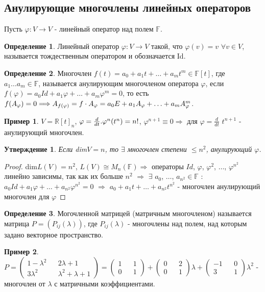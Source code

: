 \documentclass[a4paper, 12pt]{article}
\newcommand{\R}{\mathbb R}
\newcommand{\F}{\mathbb F}
\renewcommand{\phi}{\varphi}
\theoremstyle{definition}
\newtheorem*{definition}{Определение}
\newtheorem*{example1}{Пример}
\theoremstyle{plain}
\newtheorem*{subtheorem}{Утверждение}
\theoremstyle{remark}
\begin{document}
  \subsection{Анулирующие многочлены линейных операторов}
  Пусть $\phi: V\to V$ - линейный оператор над полем $\F$. \\
  \begin{definition}
    Линейный оператор $\phi: V\to V$ такой, что $\phi(v) = v$ $\forall v\in V$, называется тождественным оператором и обозначается Id.
  \end{definition}
  \begin{definition}
    Многочлен $f(t) = a_0+a_1t+\ldots+a_mt^m\in\F[t]$, где $a_1\ldots a_m\in\F$, называется анулирующим многочленом оператора $\phi$, если $f(\phi) = a_0Id+a_1\phi+\ldots+a_m\phi^m = 0$, то есть $f(A_{\phi}) = 0 \\
    \Longrightarrow A_{f(\phi)} = f\cdot A_{\phi} = a_0E+a_1A_{\phi}+\ldots+a_mA_{\phi}^m$.
  \end{definition}
  \begin{example1}
    $V = \R[t]_n$, $\phi = \frac{d}{dt}. \\
    \phi^n(t^n) = n!$, $\phi^{n+1}\equiv0 \Longrightarrow$ для $\phi = \frac{d}{dt}$ $t^{n+1}$ - анулирующий многочлен.
  \end{example1}
  \begin{subtheorem}
    Если dim$V = n$, то $\exists$ многочлен степени $\leq n^2$, анулирующий $\phi$. 
  \end{subtheorem}
  \begin{proof}
    dim$L(V) = n^2$, $L(V) \cong M_n(\F) \Longrightarrow$ операторы $Id$, $\phi$, $\phi^2$, $\ldots$, $\phi^{n^2}$ линейно зависимы, так как их больше $n^2$ $\Longrightarrow$ $\exists$ $a_0$, $\ldots$, $a_{n^2} \in \F$ : $a_0Id+a_1\phi+\ldots+a_{n^2}\phi^{n^2} = 0$ $\Longrightarrow$ $a_0+a_1t+\ldots+a_{n^2}t^{n^2}$ - многочлен анулирующий многочлен для $\phi$
  \end{proof}
  \begin{definition}
    Могочленной матрицей (матричным многочленом) называется матрица $P = (P_{ij}(\lambda))$, где $P_{ij}(\lambda)$ - многочлены над полем, над которым задано векторное пространство.
  \end{definition}
  \begin{example1}
    $P = \begin{pmatrix}
      1-\lambda^2 && 2\lambda+1\\
      3\lambda^2 && \lambda^2+\lambda+1
    \end{pmatrix} = \begin{pmatrix}
      1 && 1\\
      0 && 1
    \end{pmatrix}+\begin{pmatrix}
      0 && 2\\
      0 && 1
    \end{pmatrix}\lambda+\begin{pmatrix}
      -1 && 0\\
      3 && 1
    \end{pmatrix}\lambda^2$ - многочлен от $\lambda$ с матричными коэффициентами.
  \end{example1}
\end{document}
